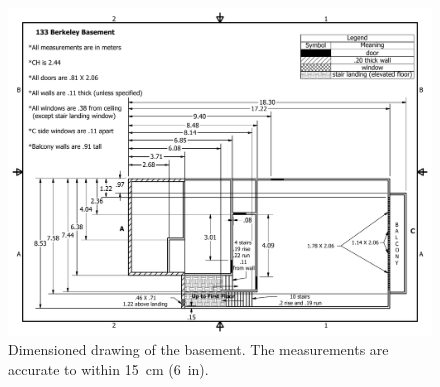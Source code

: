 \documentclass[12pt,oneside]{book}
\begin{document}
\begin{figure}[!ht]
\includegraphics[width=6.5in]{../Figures/Drawing_Basement_Metric}
\caption[Dimensioned drawing of the basement.]{Dimensioned drawing of the basement. The measurements are accurate to within 15~cm (6~in).}
\label{fig:drawing_basement}
\end{figure}
\end{document}
